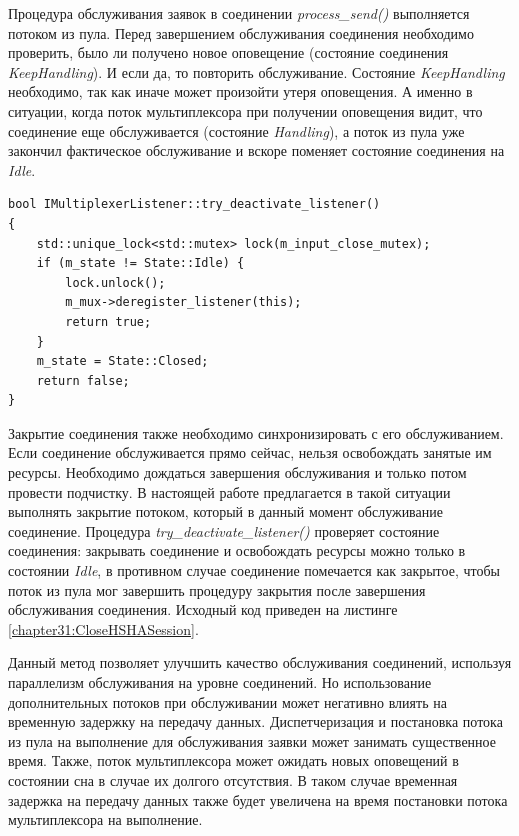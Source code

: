 Процедура обслуживания заявок в соединении \textit{process\_send()} выполняется потоком из пула. Перед завершением обслуживания соединения необходимо проверить, было ли получено новое оповещение (состояние соединения \textit{KeepHandling}). И если да, то повторить обслуживание. Состояние \textit{KeepHandling} необходимо, так как иначе может произойти утеря оповещения. А именно в ситуации, когда поток мультиплексора при получении оповещения видит, что соединение еще обслуживается (состояние \textit{Handling}), а поток из пула уже закончил фактическое обслуживание и вскоре поменяет состояние соединения на \textit{Idle}.

\begin{lstlisting}[float=!h,caption={Процедура закрытия соединения в мультиплексоре оповещений},label={chapter31:CloseHSHASession},frame=tlrb]
bool IMultiplexerListener::try_deactivate_listener()
{
    std::unique_lock<std::mutex> lock(m_input_close_mutex);
    if (m_state != State::Idle) {
        lock.unlock();
        m_mux->deregister_listener(this);
        return true;
    }
    m_state = State::Closed;
    return false;
}
\end{lstlisting}

Закрытие соединения также необходимо синхронизировать с его обслуживанием. Если соединение обслуживается прямо сейчас, нельзя освобождать занятые им ресурсы. Необходимо дождаться завершения обслуживания и только потом провести подчистку. В настоящей работе предлагается в такой ситуации выполнять закрытие потоком, который в данный момент обслуживание соединение. Процедура \textit{try\_deactivate\_listener()} проверяет состояние соединения: закрывать соединение и освобождать ресурсы можно только в состоянии \textit{Idle}, в противном случае соединение помечается как закрытое, чтобы поток из пула мог завершить процедуру закрытия после завершения обслуживания соединения. Исходный код приведен на листинге \ref{chapter31:CloseHSHASession}.

Данный метод позволяет улучшить качество обслуживания соединений, используя параллелизм обслуживания на уровне соединений. Но использование дополнительных потоков при обслуживании может негативно влиять на временную задержку на передачу данных. Диспетчеризация и постановка потока из пула на выполнение для обслуживания заявки может занимать существенное время.
Также, поток мультиплексора может ожидать новых оповещений в состоянии сна в случае их долгого отсутствия. В таком случае временная задержка на передачу данных также будет увеличена на время постановки потока мультиплексора на выполнение.

